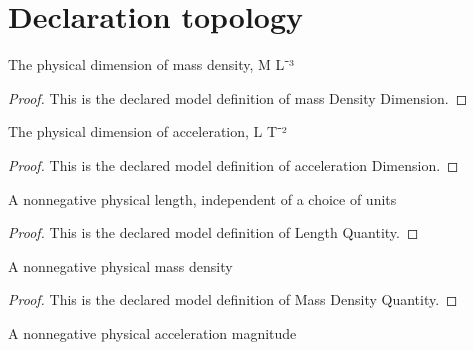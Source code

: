 \section{Declaration topology}
\begin{definition}
  \label{def:physics:phyx-mini-0724:phyxminiproblems-problemphyxmini0724-massdensitydimension}
  The physical dimension of mass density, M L⁻³
\end{definition}
\begin{proof}
  This is the declared model definition of mass Density Dimension.
\end{proof}
\begin{definition}
  \label{def:physics:phyx-mini-0724:phyxminiproblems-problemphyxmini0724-accelerationdimension}
  The physical dimension of acceleration, L T⁻²
\end{definition}
\begin{proof}
  This is the declared model definition of acceleration Dimension.
\end{proof}
\begin{definition}
  \label{def:physics:phyx-mini-0724:phyxminiproblems-problemphyxmini0724-lengthquantity}
  A nonnegative physical length, independent of a choice of units
\end{definition}
\begin{proof}
  This is the declared model definition of Length Quantity.
\end{proof}
\begin{definition}
  \label{def:physics:phyx-mini-0724:phyxminiproblems-problemphyxmini0724-massdensityquantity}
  A nonnegative physical mass density
\end{definition}
\begin{proof}
  This is the declared model definition of Mass Density Quantity.
\end{proof}
\begin{definition}
  \label{def:physics:phyx-mini-0724:phyxminiproblems-problemphyxmini0724-accelerationquantity}
  A nonnegative physical acceleration magnitude
\end{definition}
